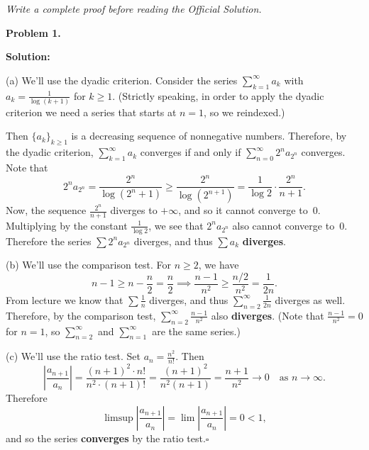 \documentclass[12pt]{article}
\newcommand{\writespace}[1]{\vspace{#1}}
\begin{document}
\newpage

\begin{tcolorbox}[
  enhanced, breakable,
  colback  = pass5gray,
  colframe = black!38,
  fonttitle = \bfseries,
  title = {Pass 5 \enspace\textbf{--}\enspace Full Proof Attempt}
]
\small\itshape Write a complete proof before reading the Official Solution.\par
\normalfont\normalsize
\writespace{19cm}
\end{tcolorbox}

\newpage

\begin{tcolorbox}[
  enhanced, breakable,
  colback  = solgreen,
  colframe = green!45!black,
  fonttitle = \bfseries,
  title = {\textsc{Official Solution}\hfill Homework 7 -- Solutions}
]
\textbf{Problem 1.}

\medskip\textbf{Solution:}

\medskip
(a) We'll use the dyadic criterion.
Consider the series $\sum_{k=1}^{\infty} a_k$ with $a_k = \frac{1}{\log(k+1)}$ for $k \geq 1$.
(Strictly speaking, in order to apply the dyadic criterion we need a series that starts at
$n=1$, so we reindexed.)

Then $\{a_k\}_{k\geq 1}$ is a decreasing sequence of nonneg\-ative numbers.
Therefore, by the dyadic criterion, $\sum_{k=1}^{\infty} a_k$ converges if and only if
$\sum_{n=0}^{\infty} 2^n a_{2^n}$ converges.
Note that
\[
  2^n a_{2^n} = \frac{2^n}{\log(2^n+1)} \geq \frac{2^n}{\log(2^{n+1})} = \frac{1}{\log 2}\cdot\frac{2^n}{n+1}.
\]
Now, the sequence $\frac{2^n}{n+1}$ diverges to $+\infty$, and so it cannot converge to~$0$.
Multiplying by the constant $\frac{1}{\log 2}$, we see that $2^n a_{2^n}$ also cannot
converge to~$0$.
Therefore the series $\sum 2^n a_{2^n}$ diverges, and thus $\sum a_k$ \textbf{diverges}.

\medskip
(b) We'll use the comparison test.
For $n \geq 2$, we have
\[
  n-1 \geq n - \frac{n}{2} = \frac{n}{2}
  \implies
  \frac{n-1}{n^2} \geq \frac{n/2}{n^2} = \frac{1}{2n}.
\]
From lecture we know that $\sum \frac{1}{n}$ diverges, and thus $\sum_{n=2}^{\infty}\frac{1}{2n}$
diverges as well.
Therefore, by the comparison test, $\sum_{n=2}^{\infty}\frac{n-1}{n^2}$ also
\textbf{diverges}.
(Note that $\frac{n-1}{n^2} = 0$ for $n=1$, so $\sum_{n=2}^{\infty}$ and
$\sum_{n=1}^{\infty}$ are the same series.)

\medskip
(c) We'll use the ratio test.
Set $a_n = \frac{n^2}{n!}$.
Then
\[
  \left|\frac{a_{n+1}}{a_n}\right|
  = \frac{(n+1)^2 \cdot n!}{n^2 \cdot (n+1)!}
  = \frac{(n+1)^2}{n^2(n+1)}
  = \frac{n+1}{n^2}
  \to 0 \quad\text{as } n\to\infty.
\]
Therefore
\[
  \limsup\left|\frac{a_{n+1}}{a_n}\right| = \lim\left|\frac{a_{n+1}}{a_n}\right| = 0 < 1,
\]
and so the series \textbf{converges} by the ratio test.\hfill$\square$
\end{tcolorbox}
\end{document}
